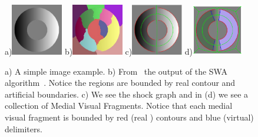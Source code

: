 \begin{figure}[ht]
\center
a)\includegraphics[width=0.2\textwidth]{figs/torus.jpg}
b)\includegraphics[width=0.2\textwidth]{figs/shaded-torus-segmentation.jpg}
c)\includegraphics[width=0.2\textwidth]{figs/torus_contours_shocks.pdf}
d)\includegraphics[width=0.2\textwidth]{figs/torus_mvf.pdf}
\caption{a) A simple image example. b) From~\cite{Tamrakar:Kimia:POCV04} the output of the SWA algorithm~\cite{Sharon:etal:CVPR01}. Notice the regions are bounded by real contour and artificial boundaries. c) We see the shock graph and in (d) we see a collection of Medial Visual Fragments. Notice that each medial visual fragment is bounded by red (real ) contours and blue (virtual) delimiters.}
\label{fig:torus_prob}
\end{figure}

